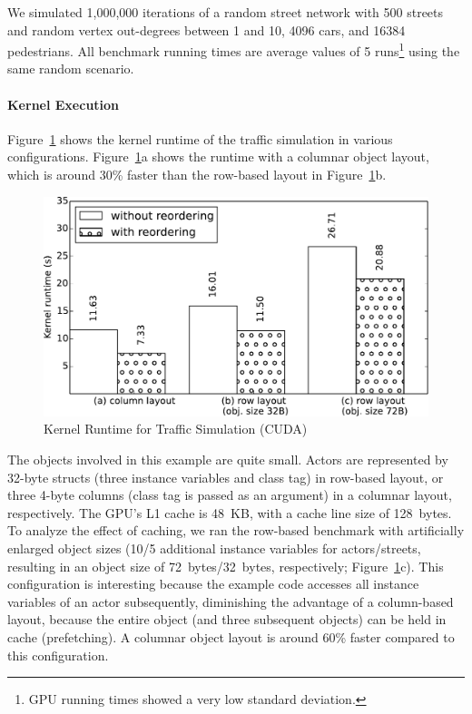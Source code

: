 \documentclass[preprint]{sigplanconf}
\begin{document}
We simulated 1,000,000 iterations of a random street network with 500 streets and random vertex out-degrees between 1 and 10, 4096 cars, and 16384 pedestrians. All benchmark running times are average values of 5 runs\footnote{GPU running times showed a very low standard deviation.} using the same random scenario.

\paragraph{Kernel Execution}
Figure~\ref{fig:bench_kernel} shows the kernel runtime of the traffic simulation in various configurations. Figure~\ref{fig:bench_kernel}a shows the runtime with a columnar object layout, which is around 30\% faster than the row-based layout in Figure~\ref{fig:bench_kernel}b.

\begin{figure}[!htp]
    \includegraphics[width=0.95\columnwidth]{bench_1.pdf}
    \centering
    \caption{Kernel Runtime for Traffic Simulation (CUDA)}
    \label{fig:bench_kernel}
\end{figure}

The objects involved in this example are quite small. Actors are represented by 32-byte structs (three instance variables and class tag) in row-based layout, or three 4-byte columns (class tag is passed as an argument) in a columnar layout, respectively. The GPU's L1 cache is 48~KB, with a cache line size of 128~bytes. To analyze the effect of caching, we ran the row-based benchmark with artificially enlarged object sizes (10/5 additional instance variables for actors/streets, resulting in an object size of 72~bytes/32~bytes, respectively; Figure~\ref{fig:bench_kernel}c). This configuration is interesting because the example code accesses all instance variables of an actor subsequently, diminishing the advantage of a column-based layout, because the entire object (and three subsequent objects) can be held in cache (prefetching). A columnar object layout is around 60\% faster compared to this configuration.
\end{document}
